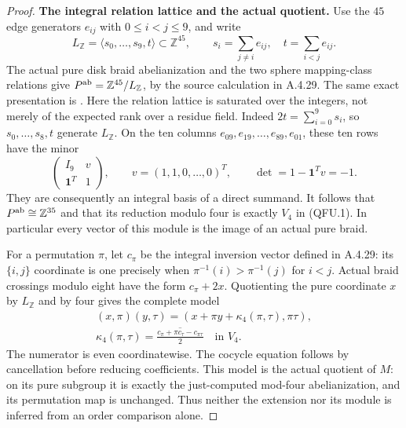 \begin{proof}
\par\medskip\noindent\textbf{The integral relation lattice and the actual quotient.}\quad
Use the $45$ edge generators $e_{ij}$ with
$0\leq i<j\leq9$, and write
\[
 L_{\mathbb Z}=\langle s_0,\ldots,s_9,t\rangle
       \subset\mathbb Z^{45},\qquad
 s_i=\sum_{j\ne i}e_{ij},\quad t=\sum_{i<j}e_{ij}.
                                                               \tag{QFU.4}
\]
The actual pure disk braid abelianization and the two
sphere mapping-class relations give
$P^{\rm ab}=\mathbb Z^{45}/L_{\mathbb Z}$, by the
source calculation in A.4.29.  The same exact presentation is
\cite[Theorem~3.2, printed p.~6]{CA_EndoKamada2016}.
Here the relation lattice is saturated over the integers,
not merely of the expected rank over a residue field.
Indeed $2t=\sum_{i=0}^9s_i$, so
$s_0,\ldots,s_8,t$ generate $L_{\mathbb Z}$.
On the ten columns
$e_{09},e_{19},\ldots,e_{89},e_{01}$, these ten rows
have the minor
\[
 \begin{pmatrix}I_9&v\\ \boldsymbol1^T&1\end{pmatrix},
 \qquad v=(1,1,0,\ldots,0)^T,
 \qquad\det=1-\boldsymbol1^Tv=-1.
                                                               \tag{QFU.5}
\]
They are consequently an integral basis of a direct summand.
It follows that $P^{\rm ab}\cong\mathbb Z^{35}$ and
that its reduction modulo four is exactly $V_4$ in
(QFU.1).  In particular every vector of this module is the
image of an actual pure braid.

For a permutation $\pi$, let $c_\pi$ be the integral
inversion vector defined in A.4.29: its $\{i,j\}$ coordinate
is one precisely when $\pi^{-1}(i)>\pi^{-1}(j)$ for
$i<j$.  Actual braid crossings modulo eight have the form
$c_\pi+2x$.  Quotienting the pure coordinate $x$ by
$L_{\mathbb Z}$ and by four gives the complete model
\[
\begin{gathered}
 (x,\pi)(y,\tau)
    =(x+\pi y+\kappa_4(\pi,\tau),\pi\tau),\\
 \kappa_4(\pi,\tau)
    =\overline{\frac{c_\pi+\pi c_\tau-c_{\pi\tau}}2}
       \quad\text{in }V_4.
\end{gathered}                                                  \tag{QFU.6}
\]
The numerator is even coordinatewise.  The cocycle equation
follows by cancellation before reducing coefficients.
This model is the actual quotient of $M$: on its pure
subgroup it is exactly the just-computed mod-four
abelianization, and its permutation map is unchanged.
Thus neither the extension nor its module is inferred from
an order comparison alone.


\end{proof}
